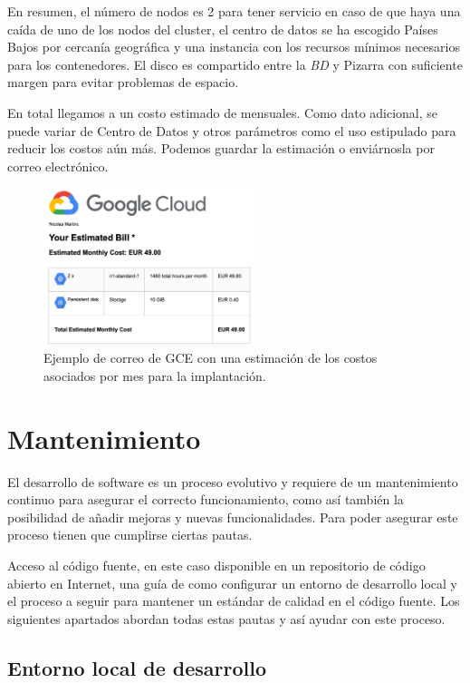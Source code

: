 \documentclass[11pt,spanish,listoffigures,listoftables]{tfgetsinf}
\begin{document}
En resumen, el número de nodos es 2 para tener servicio en caso de que haya una caída de uno de los nodos del cluster, el centro de datos se ha escogido Países Bajos por cercanía geográfica y una instancia con los recursos mínimos necesarios para los contenedores. El disco es compartido entre la \textit{BD} y Pizarra con suficiente margen para evitar problemas de espacio.

En total llegamos a un costo estimado de  mensuales. Como dato adicional, se puede variar de Centro de Datos y otros parámetros como el uso estipulado para reducir los costos aún más. Podemos guardar la estimación o enviárnosla por correo electrónico.


\begin{figure}[ht]
	\centering
	\includegraphics[width=0.55\textwidth]{img/google-cloud-engine-estimated-cost}
	\caption[Estimación de costos en GCE]{Ejemplo de correo de GCE con una estimación de los costos asociados por mes para la implantación.}
	\label{figura:gce-estimated-cost-email}
\end{figure}

\chapter{Mantenimiento}

El desarrollo de software es un proceso evolutivo y requiere de un mantenimiento continuo para asegurar el correcto funcionamiento, como así también la posibilidad de añadir mejoras y nuevas funcionalidades. Para poder asegurar este proceso tienen que cumplirse ciertas pautas.

Acceso al código fuente, en este caso disponible en un repositorio de código abierto en Internet, una guía de como configurar un entorno de desarrollo local y el proceso a seguir para mantener un estándar de calidad en el código fuente. Los siguientes apartados abordan todas estas pautas y así ayudar con este proceso.

\section{Entorno local de desarrollo}
\end{document}
